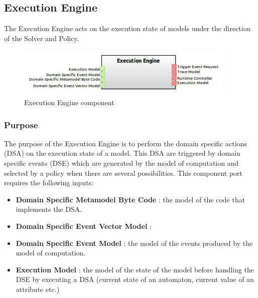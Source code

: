 \documentclass{gemoc} %
\begin{document}
\subsection{Execution Engine}
The Execution Engine acts on the execution state of models under the direction of the Solver and Policy.
\begin{figure}[htp]
	\begin{center}
	\includegraphics*[trim=0.0cm 0.0cm 0cm 0.0cm, clip=true, scale=1.0]{../images/generated/Generated_Execution Engine.jpg}
	\caption{Execution Engine component}
	\end{center}
\end{figure}

\subsubsection{Purpose}
The purpose of the Execution Engine is to perform the domain specific actions (DSA) on the execution state of a model. This DSA are triggered by domain specific events (DSE) which are generated by the model of computation and selected by a policy when there are several possibilities.
This component port requires the following inputs:
\begin{itemize}
  \item \textbf{Domain Specific Metamodel Byte Code} :
  the model of the code that implements the DSA.
  \item \textbf{Domain Specific Event Vector Model} :
  \item \textbf{Domain Specific Event Model} :
  the model of the events produced by the model of computation.
  \item \textbf{Execution Model} :
    the model of the state of the model before handling the DSE by executing a DSA (current state of an automaton, current value of an attribute etc.)
\end{itemize}
\end{document}
